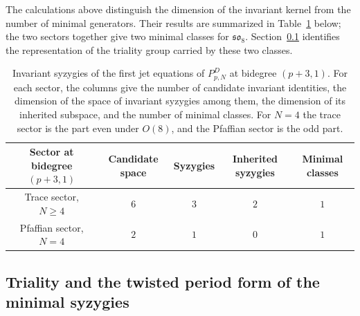 \documentclass[10pt,reqno]{amsart}
\numberwithin{equation}{section}
\theoremstyle{plain}
\theoremstyle{definition}
\begin{document}
The calculations above distinguish the dimension of the invariant kernel from the number of minimal generators. Their results are summarized in Table~\ref{tab:typeDsyzygies} below; the two sectors together give two minimal classes for $\mathfrak{so}_8$. Section~\ref{sec:triality} identifies the representation of the triality group carried by these two classes.
\begin{table}[H]
    \centering
    \begin{tabular}{c|cccc}
        \toprule
        Sector at bidegree $(p+3,1)$ & Candidate space & Syzygies & Inherited syzygies & Minimal classes \\\midrule
        Trace sector, $N\ge4$ & $6$ & $3$ & $2$ & $1$ \\
        Pfaffian sector, $N=4$ & $2$ & $1$ & $0$ & $1$ \\\bottomrule
    \end{tabular}
    \caption{Invariant syzygies of the first jet equations of $P^D_{p,N}$ at bidegree $(p+3,1)$. For each sector, the columns give the number of candidate invariant identities, the dimension of the space of invariant syzygies among them, the dimension of its inherited subspace, and the number of minimal classes. For $N=4$ the trace sector is the part even under $O(8)$, and the Pfaffian sector is the odd part.}
\label{tab:typeDsyzygies}
\end{table}

\subsection{Triality and the twisted period form of the minimal syzygies}\label{sec:triality}
\end{document}
